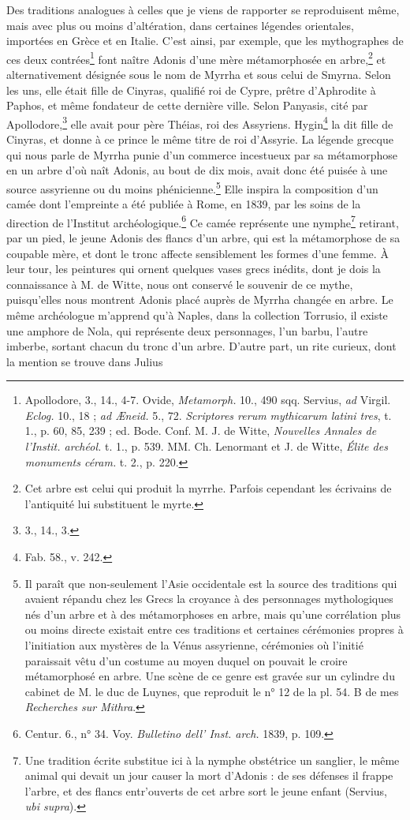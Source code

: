 \documentclass{article}
\begin{document}
Des traditions analogues à celles que je viens de rapporter se reproduisent même, mais avec plus ou moins d'altération, dans certaines légendes orientales, importées en Grèce et en Italie. C'est ainsi, par exemple, que les mythographes de ces deux contrées\footnote{Apollodore, 3., 14., 4-7. Ovide, \emph{Metamorph.} 10., 490 sqq. Servius, \emph{ad} Virgil. \emph{Eclog.} 10., 18 ; \emph{ad Æneid.} 5., 72. \emph{Scriptores rerum mythicarum latini tres}, t. 1., p. 60, 85, 239 ; ed. Bode. Conf. M. J. de Witte, \emph{Nouvelles Annales de l'Instit. archéol.} t. 1., p. 539. MM. Ch. Lenormant et J. de Witte, \emph{Élite des monuments céram.} t. 2., p. 220.} font naître Adonis d'une mère métamorphosée en arbre,\footnote{Cet arbre est celui qui produit la myrrhe. Parfois cependant les écrivains de l'antiquité lui substituent le myrte.} et alternativement désignée sous le nom de Myrrha et sous celui de Smyrna. Selon les uns, elle était fille de Cinyras, qualifié roi de Cypre, prêtre d'Aphrodite à Paphos, et même fondateur de cette dernière ville. Selon Panyasis, cité par Apollodore,\footnote{3., 14., 3.} elle avait pour père Théias, roi des Assyriens. Hygin\footnote{Fab. 58., v. 242.} la dit fille de Cinyras, et donne à ce prince le même titre de roi d'Assyrie. La légende grecque qui nous parle de Myrrha punie d'un commerce incestueux par sa métamorphose en un arbre d'où naît Adonis, au bout de dix mois, avait donc été puisée à une source assyrienne ou du moins phénicienne.\footnote{Il paraît que non-seulement l'Asie occidentale est la source des traditions qui avaient répandu chez les Grecs la croyance à des personnages mythologiques nés d'un arbre et à des métamorphoses en arbre, mais qu'une corrélation plus ou moins directe existait entre ces traditions et certaines cérémonies propres à l'initiation aux mystères de la Vénus assyrienne, cérémonies où l'initié paraissait vêtu d'un costume au moyen duquel on pouvait le croire métamorphosé en arbre. Une scène de ce genre est gravée sur un cylindre du cabinet de M. le duc de Luynes, que reproduit le n° 12 de la pl. 54. B de mes \emph{Recherches sur Mithra}.} Elle inspira la composition d'un camée dont l'empreinte a été publiée à Rome, en 1839, par les soins de la direction de l'Institut archéologique.\footnote{Centur. 6., n° 34. Voy. \emph{Bulletino dell' Inst. arch.} 1839, p. 109.} Ce camée représente une nymphe\footnote{Une tradition écrite substitue ici à la nymphe obstétrice un sanglier, le même animal qui devait un jour causer la mort d'Adonis : de ses défenses il frappe l'arbre, et des flancs entr'ouverts de cet arbre sort le jeune enfant (Servius, \emph{ubi supra}).} retirant, par un pied, le jeune Adonis des flancs d'un arbre, qui est la métamorphose de sa coupable mère, et dont le tronc affecte sensiblement les formes d'une femme. À leur tour, les peintures qui ornent quelques vases grecs inédits, dont je dois la connaissance à M. de Witte, nous ont conservé le souvenir de ce mythe, puisqu'elles nous montrent Adonis placé auprès de Myrrha changée en arbre. Le même archéologue m'apprend qu'à Naples, dans la collection Torrusio, il existe une amphore de Nola, qui représente deux personnages, l'un barbu, l'autre imberbe, sortant chacun du tronc d'un arbre. D'autre part, un rite curieux, dont la mention se trouve dans Julius 
\end{document}
